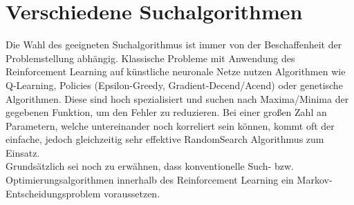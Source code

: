 \section{Verschiedene Suchalgorithmen}
\label{sec:rl_alt}
	Die Wahl des geeigneten Suchalgorithmus ist immer von der Beschaffenheit der Problemstellung abhängig. Klassische Probleme mit Anwendung des Reinforcement Learning auf künstliche neuronale Netze nutzen Algorithmen wie Q-Learning, Policies (Epsilon-Greedy, Gradient-Decend/Acend) oder genetische Algorithmen. Diese sind hoch spezialisiert und suchen nach Maxima/Minima der gegebenen Funktion, um den Fehler zu reduzieren. Bei einer großen Zahl an Parametern, welche untereinander noch korreliert sein können, kommt oft der einfache, jedoch gleichzeitig sehr effektive \glqq RandomSearch\grqq{} Algorithmus zum Einsatz.\\
	Grundsätzlich sei noch zu erwähnen, dass konventionelle Such- bzw. Optimierungsalgorithmen innerhalb des Reinforcement Learning ein Markov-Entscheidungsproblem voraussetzen. 
